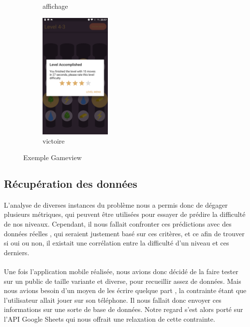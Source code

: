 \documentclass[a4paper, 11pt]{article}
\begin{document}
\begin{figure}[h!]
\begin{subfigure}{0.23\textwidth}
        \caption{affichage}
    \end{subfigure}%
    \begin{subfigure}{0.23\textwidth}
        \centering
        \includegraphics[height=2.5in]{g4}
        \caption{victoire}
    \end{subfigure}
    \caption{Exemple Gameview}
\end{figure}

	\subsection{Récupération des données}
	
	\paragraph{}
	L’analyse de diverses instances du problème nous a permis donc de dégager plusieurs métriques, qui peuvent être utilisées pour essayer de prédire la difficulté de nos niveaux. Cependant, il nous fallait confronter ces prédictions avec des données réelles , qui seraient justement basé sur ces critères, et ce afin de trouver si oui ou non, il existait une corrélation entre la difficulté d’un niveau et ces derniers. 
	\paragraph{}
Une fois l’application mobile réalisée, nous avions donc décidé de la faire tester sur un public de taille variante et diverse, pour recueillir assez de données. Mais nous avions besoin d’un moyen de les écrire quelque part , la contrainte étant que l’utilisateur allait jouer sur son téléphone. Il nous fallait donc envoyer ces informations sur une sorte de base de données. Notre regard s’est alors porté sur l’API Google Sheets qui nous offrait une relaxation de cette contrainte.
\end{document}
